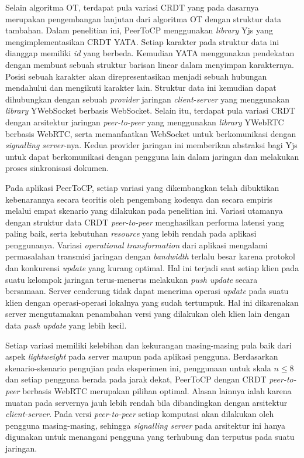 Selain algoritma OT, terdapat pula variasi CRDT yang pada dasarnya merupakan pengembangan lanjutan dari algoritma OT dengan struktur data tambahan. Dalam penelitian ini, PeerToCP menggunakan \textit{library} Yjs yang mengimplementasikan CRDT YATA. Setiap karakter pada struktur data ini dianggap memiliki \textit{id} yang berbeda. Kemudian YATA menggunakan pendekatan dengan membuat sebuah struktur barisan linear dalam menyimpan karakternya. Posisi sebuah karakter akan direpresentasikan menjadi sebuah hubungan mendahului dan mengikuti karakter lain. Struktur data ini kemudian dapat dihubungkan dengan sebuah \textit{provider} jaringan \textit{client-server} yang menggunakan \textit{library} YWebSocket berbasis WebSocket. Selain itu, terdapat pula variasi CRDT dengan arsitektur jaringan \textit{peer-to-peer} yang menggunakan \textit{library} YWebRTC berbasis WebRTC, serta memanfaatkan WebSocket untuk berkomunikasi dengan \textit{signalling server}-nya. Kedua provider jaringan ini memberikan abstraksi bagi Yjs untuk dapat berkomunikasi dengan pengguna lain dalam jaringan dan melakukan proses sinkronisasi dokumen.

Pada aplikasi PeerToCP, setiap variasi yang dikembangkan telah dibuktikan kebenarannya secara teoritis oleh pengembang kodenya dan secara empiris melalui empat skenario yang dilakukan pada penelitian ini. Variasi utamanya dengan struktur data CRDT \textit{peer-to-peer} menghasilkan performa latensi yang paling baik, serta kebutuhan \textit{resource} yang lebih rendah pada aplikasi penggunanya. Variasi \textit{operational transformation} dari aplikasi mengalami permasalahan transmisi jaringan dengan \textit{bandwidth} terlalu besar karena protokol dan konkurensi \textit{update} yang kurang optimal. Hal ini terjadi saat setiap klien pada suatu kelompok jaringan terus-menerus melakukan \textit{push update} secara bersamaan. Server cenderung tidak dapat menerima operasi \textit{update} pada suatu klien dengan operasi-operasi lokalnya yang sudah tertumpuk. Hal ini dikarenakan server mengutamakan penambahan versi yang dilakukan oleh klien lain dengan data \textit{push update} yang lebih kecil.

Setiap variasi memiliki kelebihan dan kekurangan masing-masing pula baik dari aspek \textit{lightweight} pada server maupun pada aplikasi pengguna. Berdasarkan skenario-skenario pengujian pada eksperimen ini, penggunaan untuk skala $n \leq 8$ dan setiap pengguna berada pada jarak dekat, PeerToCP dengan CRDT \textit{peer-to-peer} berbasis WebRTC merupakan pilihan optimal. Alasan lainnya ialah karena muatan pada servernya jauh lebih rendah bila dibandingkan dengan arsitektur \textit{client-server}. Pada versi \textit{peer-to-peer} setiap komputasi akan dilakukan oleh pengguna masing-masing, sehingga \textit{signalling server} pada arsitektur ini hanya digunakan untuk menangani pengguna yang terhubung dan terputus pada suatu jaringan.

